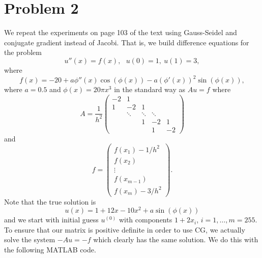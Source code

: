 \documentclass{article}
\begin{document}
\section{Problem 2}
We repeat the experiments on page 103 of the text using Gauss-Seidel and conjugate gradient instead of
Jacobi.
That is, we build difference equations for the problem
\[
u''(x) = f(x),~~~u(0) = 1 ,~u(1) = 3 ,
\]
where
\[
f(x) = -20 + a \phi'' (x) \cos( \phi (x)) - a ( \phi' (x) )^2 \sin ( \phi (x) ),
\]
where $a = 0.5$ and $\phi (x) = 20 \pi x^3$ in the standard way as $Au=f$ where 
\[
A = \frac{1}{h^2}\begin{pmatrix}
-2 & 1 \\
 1 & -2 & 1 \\
& \ddots & \ddots & \ddots \\
&&1&-2&1\\
&&&1 & -2  
\end{pmatrix}
\]
and 
\[
f=\begin{pmatrix}
f(x_1)-1/h^2\\
f(x_2)\\
\vdots\\
f(x_{m-1})\\
f(x_m)-3/h^2
\end{pmatrix}.
\]
Note that the true solution is
\[
u(x) = 1 + 12 x - 10 x^2 + a \sin ( \phi (x) ) 
\]
and we start with initial guess $u^{(0)}$ with components $1 + 2 x_i$,
$i=1, \ldots , m=255$. To ensure that our matrix is positive definite in order to use CG, we actually solve the system $-Au=-f$ which clearly has the same solution. We do this with the following MATLAB code.
\end{document}
